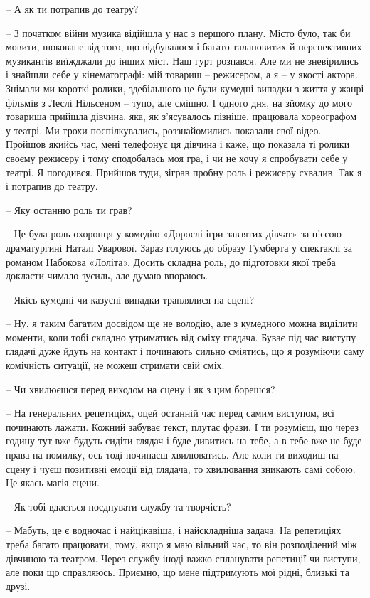 – А як ти потрапив до театру?

– З початком війни музика відійшла у нас з першого плану. Місто було, так би
мовити, шоковане від того, що відбувалося і багато талановитих й перспективних
музикантів виїжджали до інших міст. Наш гурт розпався. Але ми не зневірились і
знайшли себе у кінематографі: мій товариш –  режисером, а я – у якості актора.
Знімали ми короткі ролики, здебільшого це були кумедні випадки з життя у жанрі
фільмів з Леслі Нільсеном – тупо, але смішно. І одного дня, на зйомку до мого
товариша прийшла дівчина, яка, як з'ясувалось пізніше, працювала хореографом у
театрі. Ми трохи поспілкувались, роззнайомились показали свої відео. Пройшов
якийсь час, мені телефонує ця дівчина і каже, що показала ті ролики своєму
режисеру і тому сподобалась моя гра, і чи не хочу я спробувати себе у театрі. Я
погодився. Прийшов туди, зіграв пробну роль і режисеру схвалив. Так я і
потрапив до театру.

– Яку останню роль ти грав?

– Це була роль охоронця у комедію «Дорослі ігри завзятих дівчат» за п'єсою
драматургині Наталі Уварової. Зараз готуюсь до образу Гумберта у спектаклі за
романом Набокова «Лоліта». Досить складна роль, до підготовки якої треба
докласти чимало зусиль, але думаю впораюсь.

– Якісь кумедні чи казусні випадки траплялися на сцені? 

– Ну, я таким багатим досвідом ще не володію, але з кумедного можна виділити
моменти, коли тобі складно утриматись від сміху глядача. Буває під час виступу
глядачі дуже йдуть на контакт і починають сильно сміятись, що я розуміючи саму
комічність ситуації, не можеш стримати свій сміх. 

– Чи хвилюєшся перед виходом на сцену і як з цим борешся?

– На генеральних репетиціях, оцей останній час перед самим виступом, всі
починають лажати. Кожний забуває текст, плутає фрази. І ти розумієш, що через
годину тут вже будуть сидіти глядач і буде дивитись на тебе, а в тебе вже не
буде права на помилку, ось тоді починаєш хвилюватись. Але коли ти виходиш на
сцену і чуєш позитивні емоції від глядача, то хвилювання зникають самі собою.
Це якась магія сцени. 

– Як тобі вдається поєднувати службу та творчість?

– Мабуть, це є водночас і найцікавіша, і найскладніша задача. На репетиціях
треба багато працювати, тому, якщо я маю вільний час, то він розподілений між
дівчиною та театром. Через службу іноді важко спланувати репетиції чи виступи,
але поки що справляюсь. Приємно, що мене підтримують мої рідні, близькі та
друзі. 

